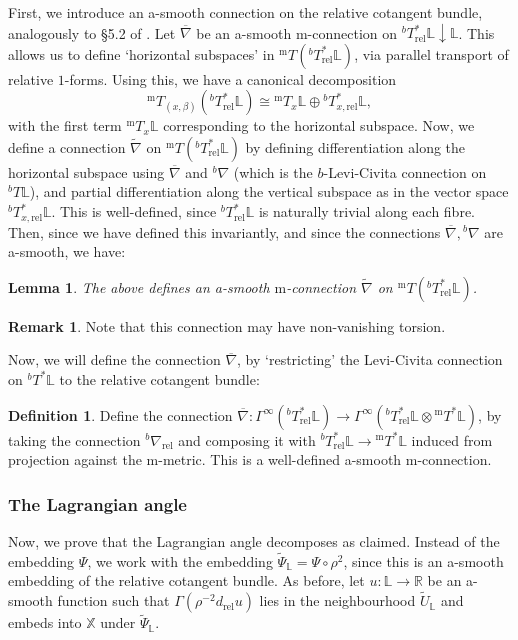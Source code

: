 \documentclass[10pt, a4paper]{article}
\theoremstyle{plain}%
\newtheorem{lem}[theorem]{Lemma}
\theoremstyle{definition}
\newtheorem{defn}[theorem]{Definition}
\newtheorem{rem}[theorem]{Remark}
\numberwithin{figure}{section}
\numberwithin{equation}{section}
\newcommand{\bL}{\mathbb{L}}
\newcommand{\bX}{\mathbb{X}}
\newcommand{\bR}{\mathbb{R}}
\newcommand{\rt}{\rightarrow}
\newcommand{\tpsil}{\tilde{\Psi}_\bL}
\newcommand{\rel}{\mathrm{rel}}
\newcommand{\wtnabla}{\widetilde{\nabla}
}
\newcommand{\m}{\mathrm{m}}
\begin{document}
First, we introduce an a-smooth connection on the relative cotangent bundle, analogously to \S5.2 of \cite{Joy04}. Let $\overline{\nabla}$ be an a-smooth m-connection on $^bT^*_\rel \bL\downarrow \bL$. This allows us to define `horizontal subspaces' in $^{\m}T(^bT^*_\rel\bL)$, via parallel transport of relative $1$-forms. Using this, we have a canonical decomposition \begin{equation}\label{eq_decomposition}{^{\m}}T_{(x,\beta)}(^bT^*_\rel\bL) \cong {^{\m}T_x\bL} \oplus {^b}T^*_{x,\rel}\bL,
\end{equation}  
with the first term $^{\m}T_x\bL$ corresponding to the horizontal subspace. Now, we define a connection $\wtnabla$ on $^{\m}T(^bT^*_\rel\bL)$ by defining differentiation along the horizontal subspace using $\overline{\nabla}$ and $^b\nabla$ (which is the $b$-Levi-Civita connection on $^bT\bL$), and partial differentiation along the vertical subspace as in the vector space $^bT^*_{x,\rel}\bL$. This is well-defined, since $^bT^*_\rel\bL$ is naturally trivial along each fibre. Then, since we have defined this invariantly, and since the connections $\overline{\nabla},{^b\nabla}$ are a-smooth, we have:
\begin{lem}
	The above defines an a-smooth ${\m}$-connection $\wtnabla$ on $^{\m}T(^bT^*_\rel\bL)$.
\end{lem}
\begin{rem}
	Note that this connection may have non-vanishing torsion.
	\end{rem}

Now, we will define the connection $\overline{\nabla}$, by `restricting' the Levi-Civita connection on $^bT^*\bL$ to the relative cotangent bundle:
\begin{defn}
	Define the connection $\overline{\nabla} : \Gamma^\infty(^bT^*_\rel\bL) \rt \Gamma^\infty(^bT^*_\rel\bL \otimes {^{\m}T^*\bL})$, by taking the connection $^b\nabla_{\rel}$ and composing it with ${^bT^*_\rel \bL} \rt {^{\m}T}^*\bL$ induced from projection against the m-metric. This is a well-defined a-smooth m-connection.
\end{defn}

\subsubsection{The Lagrangian angle}
Now, we prove that the Lagrangian angle decomposes as claimed. Instead of the embedding $\Psi$, we work with the embedding $\tpsil = \Psi \circ \rho^2$, since this is an a-smooth embedding of the relative cotangent bundle. As before, let $u:\bL\rt \bR$ be an a-smooth function such that $\Gamma(\rho^{-2}d_\mathrm{rel}u)$ lies in the neighbourhood $\tilde{U}_\bL$ and embeds into $\bX$ under $\tilde{\Psi}_\bL$. 
\end{document}
